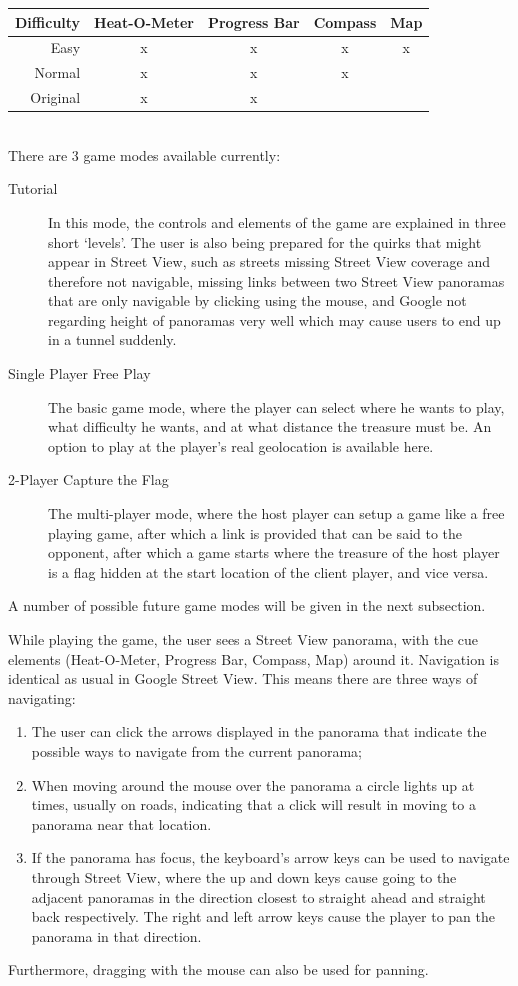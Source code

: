 \documentclass[a4paper,10pt]{article}
\begin{document}
\begin{tabular}{r||c|c|c|c}
    Difficulty & Heat-O-Meter & Progress Bar & Compass & Map \\
    \hline \hline
    Easy    & x & x & x & x \\
    Normal  & x & x & x & \\
    Original& x & x &   &
\end{tabular}\\
There are 3 game modes available currently:
\begin{description}
    \item[Tutorial] In this mode, the controls and elements of the game are explained in three short `levels'. The user is also being prepared for the quirks that might appear in Street View, such as streets missing Street View coverage and therefore not navigable, missing links between two Street View panoramas that are only navigable by clicking using the mouse, and Google not regarding height of panoramas very well which may cause users to end up in a tunnel suddenly.
    \item[Single Player Free Play] The basic game mode, where the player can select where he wants to play, what difficulty he wants, and at what distance the treasure must be. An option to play at the player's real geolocation is available here.
    \item[2-Player Capture the Flag] The multi-player mode, where the host player can setup a game like a free playing game, after which a link is provided that can be said to the opponent, after which a game starts where the treasure of the host player is a flag hidden at the start location of the client player, and vice versa.
\end{description}
A number of possible future game modes will be given in the next subsection. 

While playing the game, the user sees a Street View panorama, with the cue elements (Heat-O-Meter, Progress Bar, Compass, Map) around it. Navigation is identical as usual in Google Street View. This means there are three ways of navigating: 
\begin{enumerate}
    \item The user can click the arrows displayed in the panorama that indicate the possible ways to navigate from the current panorama;
    \item When moving around the mouse over the panorama a circle lights up at times, usually on roads, indicating that a click will result in moving to a panorama near that location.
    \item If the panorama has focus, the keyboard's arrow keys can be used to navigate through Street View, where the up and down keys cause going to the adjacent panoramas in the direction closest to straight ahead and straight back respectively. The right and left arrow keys cause the player to pan the panorama in that direction.
\end{enumerate}
Furthermore, dragging with the mouse can also be used for panning.
\end{document}

